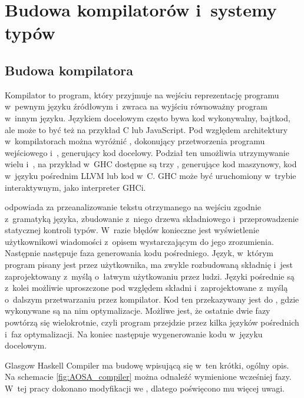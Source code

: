 \chapter{Budowa kompilatorów i~systemy typów}\label{chap:teoria}

\section{Budowa kompilatora}\label{sec:budowa_kompilatora}

Kompilator to program, który przyjmuje na wejściu reprezentację programu
w~pewnym języku źródłowym i~zwraca na wyjściu równoważny program w~innym
języku. Językiem docelowym często bywa kod wykonywalny, bajtkod, ale może to być
też na przykład C lub JavaScript. Pod względem architektury w~kompilatorach
można wyróżnić , dokonujący przetworzenia programu wejściowego
i~, generujący kod docelowy. Podział ten umożliwia utrzymywanie
wielu  i~, na przykład w~GHC dostępne są
trzy , generujące kod maszynowy, kod w~języku pośrednim LLVM
lub kod w~C\cite{AOSA}. GHC może być uruchomiony w~trybie interaktywnym, jako
interpreter GHCi.

 odpowiada za przeanalizowanie tekstu otrzymanego na wejściu
zgodnie z~gramatyką języka, zbudowanie z~niego drzewa składniowego
i~przeprowadzenie statycznej kontroli typów. W~razie błędów konieczne jest
wyświetlenie użytkownikowi wiadomości z~opisem wystarczającym do jego
zrozumienia. Następnie następuje faza generowania kodu pośredniego.
Język, w~którym program pisany jest przez użytkownika, ma zwykle rozbudowaną składnię i~jest
zaprojektowany z~myślą o~łatwym użytkowaniu przez ludzi. Języki pośrednie są
z~kolei możliwie uproszczone pod względem składni i~zaprojektowane z~myślą
o~dalszym przetwarzaniu przez kompilator. Kod ten przekazywany jest do
, gdzie wykonywane są na nim optymalizacje. Możliwe jest, że
ostatnie dwie fazy powtórzą się wielokrotnie, czyli program przejdzie przez
kilka języków pośrednich i~faz optymalizacji. Na koniec następuje wygenerowanie
kodu w~języku docelowym\cite{Dragon}.

Glasgow Haskell Compiler ma budowę wpisującą się w~ten krótki, ogólny opis. Na
schemacie \ref{fig:AOSA_compiler} można odnaleźć wymienione wcześniej fazy.
W~tej pracy dokonano modyfikacji we , dlatego poświęcono mu
więcej uwagi.

